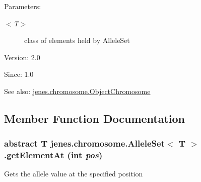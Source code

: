 \begin{Desc}
\item[Parameters:]
\begin{description}
\item[{\em $<$T$>$}]class of elements held by AlleleSet\end{description}
\end{Desc}
\begin{Desc}
\item[Version:]2.0 \end{Desc}
\begin{Desc}
\item[Since:]1.0\end{Desc}
\begin{Desc}
\item[See also:]\hyperlink{classjenes_1_1chromosome_1_1_object_chromosome}{jenes.chromosome.ObjectChromosome} \end{Desc}


\subsection{Member Function Documentation}
\hypertarget{interfacejenes_1_1chromosome_1_1_allele_set_3_01_t_01_4_10625403643dc57a5c655a92a49aa644}{
\subsubsection[getElementAt]{\setlength{\rightskip}{0pt plus 5cm}abstract T jenes.chromosome.AlleleSet$<$ T $>$.getElementAt (int {\em pos})}}
\label{interfacejenes_1_1chromosome_1_1_allele_set_3_01_t_01_4_10625403643dc57a5c655a92a49aa644}


Gets the allele value at the specified position 

